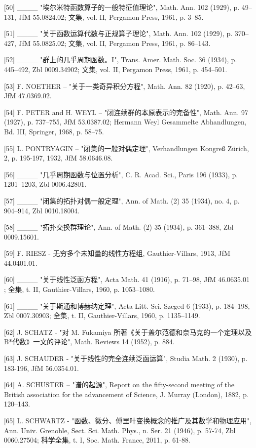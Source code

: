 {[}50{]} \_\_\_\_ "埃尔米特函数算子的一般特征值理论", Math. Ann. 102 (1929), p. 49--131, JfM 55.0824.02; 文集, vol. II, Pergamon Press, 1961, p. 3--85.

{[}51{]} \_\_\_\_ "关于函数运算代数与正规算子理论", Math. Ann. 102 (1929), p. 370--427, JfM 55.0825.02; 文集, vol. II, Pergamon Press, 1961, p. 86--143.

{[}52{]} \_\_\_\_ "群上的几乎周期函数。I", Trans. Amer. Math. Soc. 36 (1934), p. 445--492, Zbl 0009.34902; 文集, vol. II, Pergamon Press, 1961, p. 454--501.

{[}53{]} F. NOETHER -- "关于一类奇异积分方程", Math. Ann. 82 (1920), p. 42--63, JfM 47.0369.02.

{[}54{]} F. PETER and H. WEYL -- "闭连续群的本原表示的完备性", Math. Ann. 97 (1927), p. 737--755, JfM 53.0387.02; Hermann Weyl Gesammelte Abhandlungen, Bd. III, Springer, 1968, p. 58--75.

{[}55{]} L. PONTRYAGIN -- "闭集的一般对偶定理", Verhandlungen Kongreß Zürich, 2, p. 195-197, 1932, JfM 58.0646.08.

{[}56{]} \_\_\_\_ "几乎周期函数与位置分析", C. R. Acad. Sci., Paris 196 (1933), p. 1201--1203, Zbl 0006.42801.

{[}57{]} \_\_\_\_ "闭集的拓扑对偶一般定理", Ann. of Math. (2) 35 (1934), no. 4, p. 904--914, Zbl 0010.18004.

{[}58{]} \_\_\_\_ "拓扑交换群理论", Ann. of Math. (2) 35 (1934), p. 361--388, Zbl 0009.15601.

{[}59{]} F. RIESZ - 无穷多个未知量的线性方程组, Gauthier-Villars, 1913, JfM 44.0401.01.

{[}60{]} \_\_\_\_ "关于线性泛函方程", Acta Math. 41 (1916), p. 71--98, JfM 46.0635.01 ; 全集, t. II, Gauthier-Villars, 1960, p. 1053--1080.

{[}61{]} \_\_\_\_ "关于斯通和博赫纳定理", Acta Litt. Sci. Szeged 6 (1933), p. 184--198, Zbl 0007.30903; 全集, t. II, Gauthier-Villars, 1960, p. 1135--1149.

{[}62{]} J. SCHATZ - "对 M. Fukamiya 所著《关于盖尔范德和奈马克的一个定理以及 B*代数》一文的评论", Math. Reviews 14 (1952), p. 884.

{[}63{]} J. SCHAUDER - "关于线性的完全连续泛函运算", Studia Math. 2 (1930), p. 183-196, JfM 56.0354.01.

{[}64{]} A. SCHUSTER -- "谱的起源", Report on the fifty-second meeting of the British association for the advancement of Science, J. Murray (London), 1882, p. 120--143.

{[}65{]} L. SCHWARTZ - "函数、微分、傅里叶变换概念的推广及其数学和物理应用", Ann. Univ. Grenoble, Sect. Sci. Math. Phys., n. Ser. 21 (1946), p. 57-74, Zbl 0060.27504; 科学全集, t. I, Soc. Math. France, 2011, p. 61-88.

